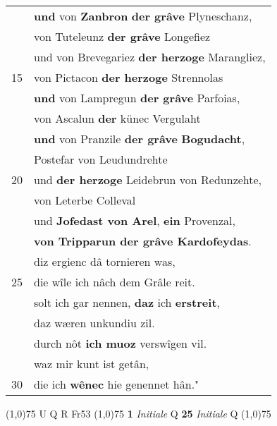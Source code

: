 \documentclass[8pt,a4paper,notitlepage]{article}
\begin{document}
\begin{table}[ht]
\begin{minipage}[t]{0.5\linewidth}
\begin{tabular}{rl}
 & \textbf{und} von \textbf{Zanbron} \textbf{der grâve} Plyneschanz,\\ 
 & von Tuteleunz \textbf{der grâve} Longefiez\\ 
 & und von Brevegariez \textbf{der herzoge} Marangliez,\\ 
15 & von Pictacon \textbf{der herzoge} Strennolas\\ 
 & \textbf{und} von Lampregun \textbf{der grâve} Parfoias,\\ 
 & von Ascalun \textbf{der} künec Vergulaht\\ 
 & \textbf{und} von Pranzile \textbf{der grâve} \textbf{Bogudacht},\\ 
 & Postefar von Leudundrehte\\ 
20 & und \textbf{der herzoge} Leidebrun von Redunzehte,\\ 
 & von Leterbe Colleval\\ 
 & und \textbf{Jofedast von Arel}, \textbf{ein} Provenzal,\\ 
 & \textbf{von Tripparun der grâve Kardofeydas}.\\ 
 & diz ergienc dâ tornieren was,\\ 
25 & die wîle ich nâch dem Grâle reit.\\ 
 & solt ich gar nennen, \textbf{daz} ich \textbf{erstreit},\\ 
 & daz wæren unkundiu zil.\\ 
 & durch nôt \textbf{ich muoz} verswîgen vil.\\ 
 & waz mir kunt ist getân,\\ 
30 & die ich \textbf{wênec} hie genennet hân."\\ 
\end{tabular}
\scriptsize
\line(1,0){75} \newline
U Q R Fr53 \newline
\line(1,0){75} \newline
\textbf{1} \textit{Initiale} Q  \textbf{25} \textit{Initiale} Q  \newline
\line(1,0){75} \newline

\end{minipage}
\end{table}
\end{document}
